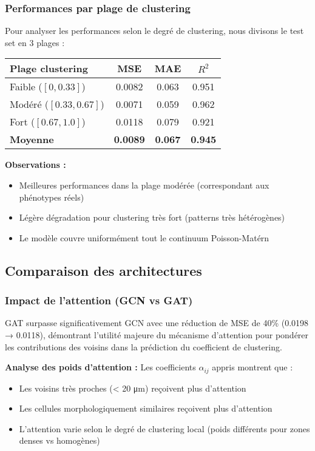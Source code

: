 \subsubsection{Performances par plage de clustering}

Pour analyser les performances selon le degré de clustering, nous divisons le test set en 3 plages :

\begin{center}
\begin{tabular}{|l|c|c|c|}
\hline
\textbf{Plage clustering} & \textbf{MSE} & \textbf{MAE} & \textbf{$R^2$} \\
\hline
Faible ($[0, 0.33]$) & 0.0082 & 0.063 & 0.951 \\
Modéré ($[0.33, 0.67]$) & 0.0071 & 0.059 & 0.962 \\
Fort ($[0.67, 1.0]$) & 0.0118 & 0.079 & 0.921 \\
\hline
\textbf{Moyenne} & \textbf{0.0089} & \textbf{0.067} & \textbf{0.945} \\
\hline
\end{tabular}
\end{center}

\textbf{Observations :}
\begin{itemize}
    \item Meilleures performances dans la plage modérée (correspondant aux phénotypes réels)
    \item Légère dégradation pour clustering très fort (patterns très hétérogènes)
    \item Le modèle couvre uniformément tout le continuum Poisson-Matérn
\end{itemize}

\subsection{Comparaison des architectures}

\subsubsection{Impact de l'attention (GCN vs GAT)}

GAT surpasse significativement GCN avec une réduction de MSE de 40\% (0.0198 → 0.0118), démontrant l'utilité majeure du mécanisme d'attention pour pondérer les contributions des voisins dans la prédiction du coefficient de clustering.

\textbf{Analyse des poids d'attention :}
Les coefficients $\alpha_{ij}$ appris montrent que :
\begin{itemize}
    \item Les voisins très proches (< 20 μm) reçoivent plus d'attention
    \item Les cellules morphologiquement similaires reçoivent plus d'attention
    \item L'attention varie selon le degré de clustering local (poids différents pour zones denses vs homogènes)
\end{itemize}

